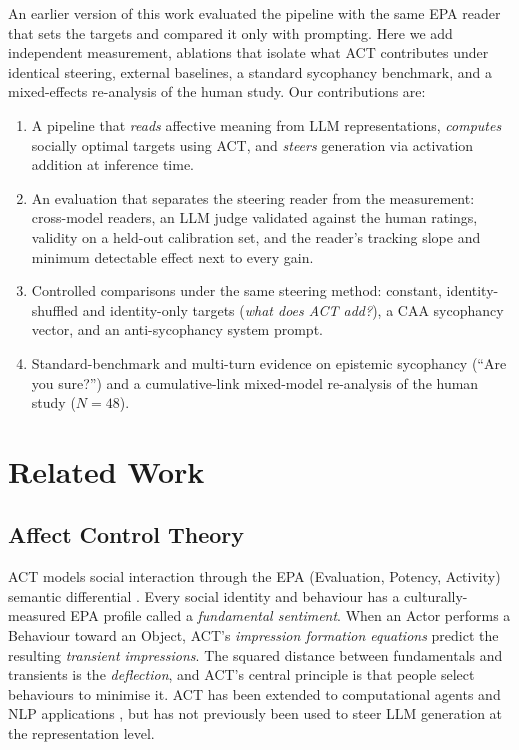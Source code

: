 \documentclass[letterpaper]{article} %
\begin{document}
An earlier version of this work evaluated the pipeline with the same EPA reader that sets the targets and compared it only with prompting. Here we add independent measurement, ablations that isolate what ACT contributes under identical steering, external baselines, a standard sycophancy benchmark, and a mixed-effects re-analysis of the human study. Our contributions are:
\begin{enumerate}
    \item A pipeline that \textit{reads} affective meaning from LLM representations, \textit{computes} socially optimal targets using ACT, and \textit{steers} generation via activation addition at inference time.
    \item An evaluation that separates the steering reader from the measurement: cross-model readers, an LLM judge validated against the human ratings, validity on a held-out calibration set, and the reader's tracking slope and minimum detectable effect next to every gain.
    \item Controlled comparisons under the same steering method: constant, identity-shuffled and identity-only targets (\textit{what does ACT add?}), a CAA sycophancy vector, and an anti-sycophancy system prompt.
    \item Standard-benchmark and multi-turn evidence on epistemic sycophancy (``Are you sure?'') and a cumulative-link mixed-model re-analysis of the human study ($N = 48$).
\end{enumerate}

\section{Related Work}

\subsection{Affect Control Theory}

ACT \citep{heise2007expressive} models social interaction through the EPA (Evaluation, Potency, Activity) semantic differential \citep{osgood1957measurement}. Every social identity and behaviour has a culturally-measured EPA profile called a \textit{fundamental sentiment}. When an Actor performs a Behaviour toward an Object, ACT's \textit{impression formation equations} predict the resulting \textit{transient impressions}. The squared distance between fundamentals and transients is the \textit{deflection}, and ACT's central principle is that people select behaviours to minimise it. ACT has been extended to computational agents \citep{hoey2016affect, schroeder2016modelling} and NLP applications \citep{alhothali2015good}, but has not previously been used to steer LLM generation at the representation level.
\end{document}

